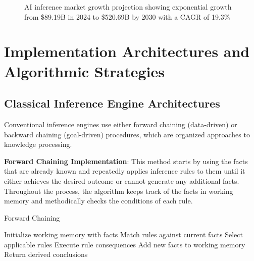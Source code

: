 \documentclass[12pt,a4paper]{article}
\begin{document}
\begin{figure}[h]
    \centering
    \caption{AI inference market growth projection showing exponential growth from \$89.19B in 2024 to \$520.69B by 2030 with a CAGR of 19.3\%}
    \label{fig:ai_inference_market_growth}
\end{figure}


\section{Implementation Architectures and Algorithmic Strategies}
\subsection{Classical Inference Engine Architectures}
Conventional inference engines use either forward chaining (data-driven) or backward chaining (goal-driven) procedures, which are organized approaches to knowledge processing.

\textbf{Forward Chaining Implementation}: This method starts by using the facts that are already known and repeatedly applies inference rules to them until it either achieves the desired outcome or cannot generate any additional facts. Throughout the process, the algorithm keeps track of the facts in working memory and methodically checks the conditions of each rule.

\begin{algorithm}
\caption{Forward Chaining}
\begin{algorithmic}
\STATE Initialize working memory with facts
    \STATE Match rules against current facts
    \STATE Select applicable rules
    \STATE Execute rule consequences
    \STATE Add new facts to working memory
\ENDWHILE
\STATE Return derived conclusions
\end{algorithmic}
\end{algorithm}
\end{document}
